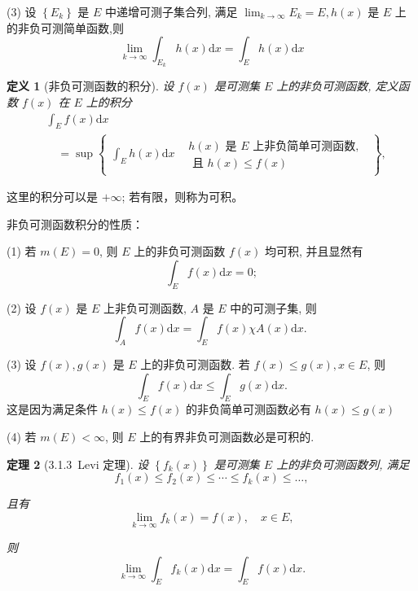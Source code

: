 \documentclass[10pt,openany]{book}
\theoremstyle{thmstyle} %
\newtheorem{theorem}{定理}[chapter]
\theoremstyle{defstyle} %
\newtheorem{definition}[theorem]{定义}
\theoremstyle{prostyle} %
\begin{document}
(3) 设 $\left\{E_k\right\}$ 是 $E$ 中递增可测子集合列, 满足 $\lim _{k \rightarrow \infty} E_k=E, h(x)$ 是 $E$ 上的非负可测简单函数,则  
$$
\lim _{k \rightarrow \infty} \int_{E_k} h(x) \mathrm{d} x=\int_E h(x) \mathrm{d} x
$$


\begin{definition}[非负可测函数的积分]
设 $f(x)$ 是可测集 $E$ 上的非负可测函数, 定义函数 $f(x)$ 在 $E$ 上的积分
$$
\begin{aligned}
& \int_E f(x) \mathrm{d} x \\
& \quad=\sup \left\{\begin{array}{l|l}
\int_E h(x) \mathrm{d} x & \begin{array}{l}
h(x) \text { 是 } E \text { 上非负简单可测函数, } \\
\text { 且 } h(x) \leq f(x)
\end{array}
\end{array}\right\},
\end{aligned}
$$
\end{definition}
这里的积分可以是 $+\infty$; 若有限，则称为可积。

\vspace{0.4cm}

非负可测函数积分的性质：

(1) 若 $m(E)=0$, 则 $E$ 上的非负可测函数 $f(x)$ 均可积, 并且显然有
$$
\int_E f(x) \mathrm{d} x=0 ;
$$

(2) 设 $f(x)$ 是 $E$ 上非负可测函数, $A$ 是 $E$ 中的可测子集, 则
$$
\int_A f(x) \mathrm{d} x=\int_E f(x) \chi A(x) \mathrm{d} x \text {. }
$$

(3) 设 $f(x), g(x)$ 是 $E$ 上的非负可测函数. 若 $f(x) \leq g(x), x \in E$, 则
$$
\int_E f(x) \mathrm{d} x \leq \int_E g(x) \mathrm{d} x .
$$
这是因为满足条件 $h(x) \leq f(x)$ 的非负简单可测函数必有 $h(x) \leq g(x)$

(4) 若 $m(E)<\infty$, 则 $E$ 上的有界非负可测函数必是可积的.



\begin{theorem}[3.1.3~Levi 定理]
设 $\left\{f_k(x)\right\}$ 是可测集 $E$ 上的非负可测函数列, 满足
$$
f_1(x) \leq f_2(x) \leq \cdots \leq f_k(x) \leq \ldots,
$$

且有
$$
\lim _{k \rightarrow \infty} f_k(x)=f(x), \quad x \in E,
$$

则
$$
\lim _{k \rightarrow \infty} \int_E f_k(x) \mathrm{d} x=\int_E f(x) \mathrm{d} x .
$$

\end{theorem}
\end{document}
